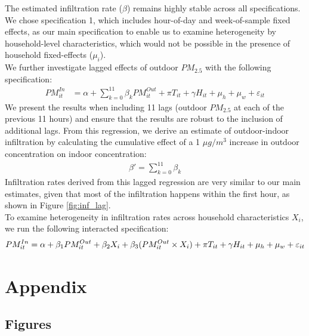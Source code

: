 \documentclass[reqno,12pt,notitlepage]{article}
\begin{document}
The estimated infiltration rate ($\beta$) remains highly stable across all specifications. We chose specification 1, which includes hour-of-day and week-of-sample fixed effects, as our main specification to enable us to examine heterogeneity by household-level characteristics, which would not be possible in the presence of household fixed-effects ($\mu_i$). 
\\ 

We further investigate lagged effects of outdoor $PM_{2.5}$ with the following specification:
\begin{align}
     PM^{In}_{it} &= \alpha + \sum_{k = 0}^{11}\beta_k PM^{Out}_{it} + \pi T_{it} + \gamma H_{it} +\mu_h + \mu_w + \varepsilon_{it}
\end{align}
We present the results when including 11 lags (outdoor $PM_{2.5}$ at each of the previous 11 hours) and ensure that the results are robust to the inclusion of additional lags. From this regression, we derive an estimate of outdoor-indoor infiltration by calculating the cumulative effect of a 1 $\mu g/m^3$ increase in outdoor concentration on indoor concentration:
\begin{align}
    \beta' = \sum_{k=0}^11 \beta_k
\end{align}
Infiltration rates derived from this lagged regression are very similar to our main estimates, given that most of the infiltration happens within the first hour, as shown in Figure \ref{fig:inf_lag}.
\\

To examine heterogeneity in infiltration rates across household characteristics $X_i$, we run the following interacted specification:
\begin{gather}
    PM^{In}_{it} = \alpha + \beta_1 PM^{Out}_{it} + \beta_2 X_i + \beta_3(PM^{Out}_{it} \times X_i) + \pi T_{it} + \gamma H_{it} + \mu_h + \mu_w + \varepsilon_{it} \notag
\end{gather}

\clearpage





\clearpage
\appendix
\section{Appendix}

\subsection{Figures}
\setcounter{figure}{0}
\renewcommand{\thefigure}{A\arabic{figure}}
\end{document}
